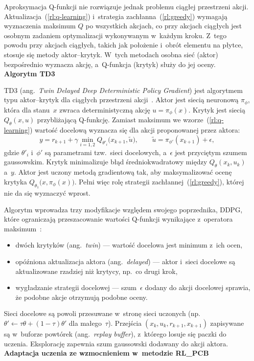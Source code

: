 Aproksymacja Q-funkcji nie rozwiązuje jednak problemu ciągłej przestrzeni
akcji. Aktualizacja~(\ref{rl:q-learning}) i~strategia
zachłanna~(\ref{rl:greedy}) wymagają wyznaczenia maksimum $Q$ po wszystkich
akcjach, co przy akcjach ciągłych jest osobnym zadaniem optymalizacji
wykonywanym w~każdym kroku. Z~tego powodu przy akcjach ciągłych, takich jak
położenie i~obrót elementu na płytce, stosuje się metody aktor--krytyk.
W~tych metodach osobna sieć (aktor) bezpośrednio wyznacza akcję, a~Q-funkcja
(krytyk) służy do jej oceny.\\[4pt]
\textbf{Algorytm TD3}
\label{sec:td3}

TD3 (ang.~\emph{Twin Delayed Deep Deterministic Policy Gradient}) jest
algorytmem typu aktor--krytyk dla ciągłych przestrzeni akcji~\cite{Fujimoto2018TD3}.
Aktor jest siecią neuronową $\pi_\phi$, która dla stanu~$x$ zwraca
deterministyczną akcję $u = \pi_\phi(x)$. Krytyk jest siecią $Q_\theta(x, u)$
przybliżającą Q-funkcję. Zamiast maksimum we wzorze~(\ref{rl:q-learning})
wartość docelową wyznacza się dla akcji proponowanej przez aktora:
\begin{equation}
  y = r_{k+1} + \gamma \min_{i=1,2} Q_{\theta'_i}\bigl(x_{k+1}, \tilde{u}\bigr),
  \qquad
  \tilde{u} = \pi_{\phi'}(x_{k+1}) + \epsilon,
  \label{rl:td3-target}
\end{equation}
gdzie $\theta'_i$ i~$\phi'$ są parametrami tzw.\ sieci docelowych, a~$\epsilon$
jest przyciętym szumem gaussowskim. Krytyk minimalizuje błąd średniokwadratowy
między $Q_\theta(x_k, u_k)$ a~$y$. Aktor jest uczony metodą gradientową tak,
aby maksymalizować ocenę krytyka $Q_{\theta_1}\bigl(x, \pi_\phi(x)\bigr)$.
Pełni więc rolę strategii zachłannej~(\ref{rl:greedy}), której nie da się
wyznaczyć wprost.

Algorytm wprowadza trzy modyfikacje względem swojego poprzednika, DDPG,
które ograniczają przeszacowanie wartości Q-funkcji wynikające
z~operatora maksimum~\cite{Fujimoto2018TD3}:
\begin{itemize}
  \item dwóch krytyków (ang.~\emph{twin}) --- wartość docelowa jest minimum
    z~ich ocen,
  \item opóźniona aktualizacja aktora (ang.~\emph{delayed}) --- aktor
    i~sieci docelowe są aktualizowane rzadziej niż krytycy, np.\ co drugi krok,
  \item wygładzanie strategii docelowej --- szum~$\epsilon$ dodany do akcji
    docelowej sprawia, że podobne akcje otrzymują podobne oceny.
\end{itemize}
Sieci docelowe są powoli przesuwane w~stronę sieci uczonych
(np.\ $\theta' \leftarrow \tau\theta + (1-\tau)\theta'$ dla małego~$\tau$).
Przejścia $(x_k, u_k, r_{k+1}, x_{k+1})$ zapisywane są w~buforze powtórek
(ang.~\emph{replay buffer}), z~którego losuje się paczki do uczenia.
Eksplorację zapewnia szum gaussowski dodawany do akcji aktora. \\[4pt]
\textbf{Adaptacja uczenia ze wzmocnieniem w~metodzie RL\_PCB}
\label{sec:rl-pcb}

